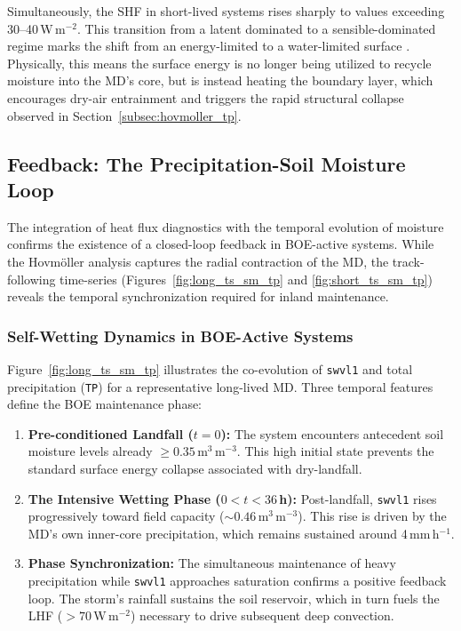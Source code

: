 Simultaneously, the SHF in short-lived systems rises sharply to
values exceeding 30--40\,W\,m$^{-2}$. This transition from a latent
dominated to a sensible-dominated regime marks the shift from an
energy-limited to a water-limited surface \autocite{seneviratne2010investigating}.
Physically, this means the surface energy is no longer being utilized
to recycle moisture into the MD's core, but is instead heating the
boundary layer, which encourages dry-air entrainment and triggers
the rapid structural collapse observed in Section~\ref{subsec:hovmoller_tp}.

\subsection{Feedback: The Precipitation-Soil Moisture Loop}
\label{subsec:ts_sm_tp}

The integration of heat flux diagnostics with the temporal evolution
of moisture confirms the existence of a closed-loop feedback in
BOE-active systems. While the Hovm\"{o}ller analysis captures the
radial contraction of the MD, the track-following time-series
(Figures~\ref{fig:long_ts_sm_tp} and \ref{fig:short_ts_sm_tp})
reveals the temporal synchronization required for inland maintenance.

\subsubsection*{Self-Wetting Dynamics in BOE-Active Systems}

Figure~\ref{fig:long_ts_sm_tp} illustrates the co-evolution of
\texttt{swvl1} and total precipitation (\texttt{TP}) for a
representative long-lived MD. Three temporal features define the BOE
maintenance phase:
\begin{enumerate}
  \item \textbf{Pre-conditioned Landfall ($t=0$):} The system
    encounters antecedent soil moisture levels already $\geq
    0.35$\,m$^3$\,m$^{-3}$. This high initial state prevents the
    standard surface energy collapse associated with dry-landfall.
  \item \textbf{The Intensive Wetting Phase ($0 < t < 36$\,h):}
    Post-landfall, \texttt{swvl1} rises progressively toward field
    capacity ($\sim 0.46$\,m$^3$\,m$^{-3}$). This rise is driven by
    the MD's own inner-core precipitation, which remains sustained
    around 4\,mm\,h$^{-1}$.
  \item \textbf{Phase Synchronization:} The simultaneous maintenance
    of heavy precipitation while \texttt{swvl1} approaches saturation
    confirms a positive feedback loop. The storm's rainfall sustains
    the soil reservoir, which in turn fuels the LHF
    ($>70$\,W\,m$^{-2}$) necessary to drive subsequent deep convection.
\end{enumerate}

